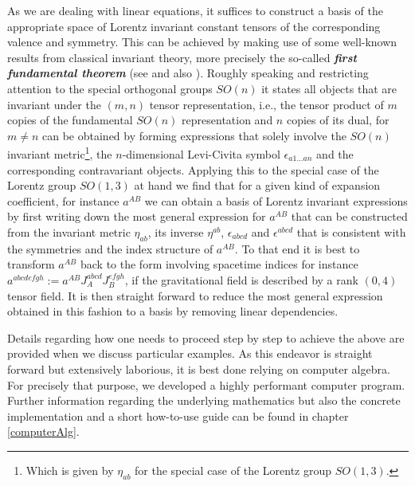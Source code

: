 As we are dealing with linear equations, it suffices to construct a basis of the appropriate space of Lorentz invariant constant tensors of the corresponding valence and symmetry. This can be achieved by making use of some well-known results from classical invariant theory, more precisely the so-called \textit{\textbf{first fundamental theorem}} (see \cite{Aslaksen1995InvariantTO} and also \cite{PROCESI1976306}). Roughly speaking and restricting attention to the special orthogonal groups $SO(n)$ it states all objects that are invariant under the $(m,n)$ tensor representation, i.e., the tensor product of $m$ copies of the fundamental $SO(n)$ representation and $n$ copies of its dual, for $m \neq n$ can be obtained by forming expressions that solely involve the $SO(n)$ invariant metric\footnote{Which is given by $\eta_{ab}$ for the special case of the Lorentz group $SO(1,3)$.}, the $n$-dimensional Levi-Civita symbol $\epsilon_{a1...an}$ and the corresponding contravariant objects. Applying this to the special case of the Lorentz group $SO(1,3)$ at hand we find that for a given kind of expansion coefficient, for instance $a^{AB}$ we can obtain a basis of Lorentz invariant expressions by first writing down the most general expression for $a^{AB}$ that can be constructed from the invariant metric $\eta_{ab}$, its inverse $\eta^{ab}$, $\epsilon_{abcd}$ and $\epsilon^{abcd}$ that is consistent with the symmetries and the index structure of $a^{AB}$. To that end it is best to transform $a^{AB}$ back to the form involving spacetime indices for instance $a^{abcdefgh} := a^{AB}J_A^{abcd}J_B^{efgh}$, if the gravitational field is described by a rank $(0,4)$ tensor field. It is then straight forward to reduce the most general expression obtained in this fashion to a basis by removing linear dependencies.

Details regarding how one needs to proceed step by step to achieve the above are provided when we discuss particular examples. As this endeavor is straight forward but extensively laborious, it is best done relying on computer algebra. For precisely that purpose, we developed a highly performant computer program. 
Further information regarding the underlying mathematics but also the concrete implementation and a short how-to-use guide can be found in chapter \ref{computerAlg}. 

